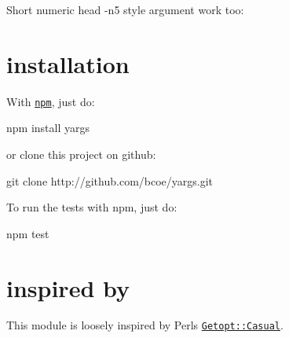 Short numeric {\ttfamily head -\/n5} style argument work too\+: 


\section*{installation }

With \href{http://github.com/isaacs/npm}{\tt npm}, just do\+: \begin{DoxyVerb}npm install yargs
\end{DoxyVerb}


or clone this project on github\+: \begin{DoxyVerb}git clone http://github.com/bcoe/yargs.git
\end{DoxyVerb}


To run the tests with npm, just do\+: \begin{DoxyVerb}npm test
\end{DoxyVerb}


\section*{inspired by }

This module is loosely inspired by Perl\textquotesingle{}s \href{http://search.cpan.org/~photo/Getopt-Casual-0.13.1/Casual.pm}{\tt Getopt\+::\+Casual}. 